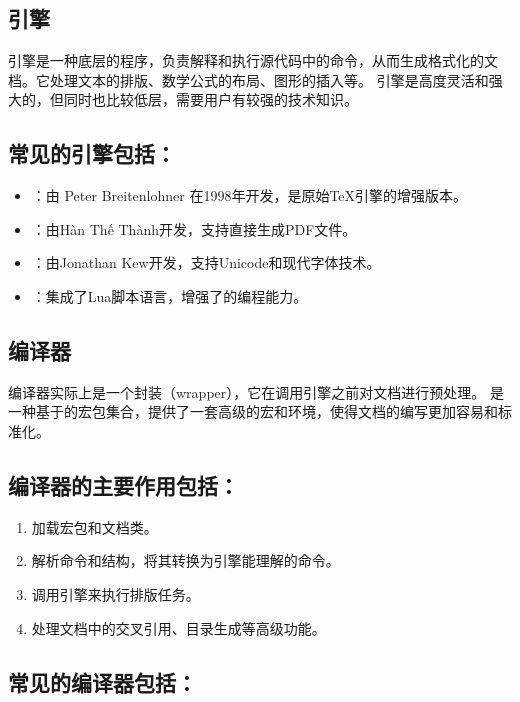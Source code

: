 \subsection*{ 引擎}
 引擎是一种底层的程序，负责解释和执行源代码中的命令，从而生成格式化的文档。它处理文本的排版、数学公式的布局、图形的插入等。 引擎是高度灵活和强大的，但同时也比较低层，需要用户有较强的技术知识。

\subsection*{常见的引擎包括：}
\begin{itemize}
	\item {}：由 Peter Breitenlohner 在1998年开发，是原始\TeX 引擎的增强版本。
	\item {}：由Hàn Thế Thành开发，支持直接生成PDF文件。
	\item {}：由Jonathan Kew开发，支持Unicode和现代字体技术。
	\item {}：集成了Lua脚本语言，增强了的编程能力。
\end{itemize}

\subsection*{ 编译器}
 编译器实际上是一个封装（wrapper），它在调用引擎之前对文档进行预处理。 是一种基于的宏包集合，提供了一套高级的宏和环境，使得文档的编写更加容易和标准化。

\subsection*{ 编译器的主要作用包括：}
\begin{enumerate}
	\item 加载宏包和文档类。
	\item 解析命令和结构，将其转换为引擎能理解的命令。
	\item 调用引擎来执行排版任务。
	\item 处理文档中的交叉引用、目录生成等高级功能。
\end{enumerate}

\subsection*{常见的编译器包括：}

